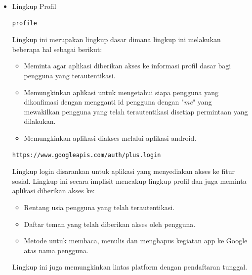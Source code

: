 \begin{itemize}
\item Lingkup Profil\\
\begin{lstlisting}[basicstyle=\footnotesize]
profile
\end{lstlisting}
Lingkup ini merupakan lingkup dasar dimana lingkup ini melakukan beberapa hal sebagai berikut:
\begin{itemize}
\item
Meminta agar aplikasi diberikan akses ke informasi profil dasar bagi pengguna yang terautentikasi.
\item
Memungkinkan aplikasi untuk mengetahui siapa pengguna yang dikonfimasi dengan mengganti id pengguna dengan "{\it me}" yang mewakilkan pengguna yang telah terautentikasi disetiap permintaan yang dilakukan.
\item
Memungkinkan aplikasi diakses melalui aplikasi android.
\end{itemize}
\begin{lstlisting}[basicstyle=\footnotesize]
https://www.googleapis.com/auth/plus.login
\end{lstlisting}
Lingkup login disarankan untuk aplikasi yang menyediakan akses ke fitur sosial. Lingkup ini secara implisit mencakup lingkup profil dan juga meminta aplikasi
diberikan akses ke:
\begin{itemize}
\item
Rentang usia pengguna yang telah terautentikasi.
\item
Daftar teman yang telah diberikan akses oleh pengguna.
\item
Metode untuk membaca, menulis dan menghapus kegiatan app ke Google atas nama pengguna.
\end{itemize}
Lingkup ini juga memungkinkan lintas platform dengan pendaftaran tunggal.


\end{itemize}

